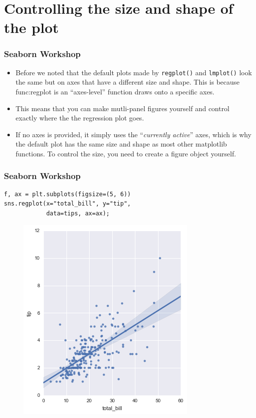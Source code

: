 \documentclass{beamer}
\begin{document}
\section{Controlling the size and shape of the plot}
\begin{frame}[fragile]
		\frametitle{Seaborn Workshop}
		\large
	\begin{itemize}
\item Before we noted that the default plots made by \texttt{regplot()} and \texttt{lmplot()} look the same but on axes that have a different size and shape. This is because func:regplot is an “axes-level” function draws onto a specific axes.
\item  This means that you can make mutli-panel figures yourself and control exactly where the the regression plot goes. 
\item If no axes is provided, it simply uses the “\textit{currently active}” axes, which is why the default plot has the same size and shape as most other matplotlib functions. To control the size, you need to create a figure object yourself.
	\end{itemize}

\end{frame}
\begin{frame}[fragile]
		\frametitle{Seaborn Workshop}
		\large
\begin{framed}
\begin{verbatim}
f, ax = plt.subplots(figsize=(5, 6))
sns.regplot(x="total_bill", y="tip", 
            data=tips, ax=ax);
\end{verbatim}
\end{framed}
\begin{figure}
	\centering
	\includegraphics[width=0.55\linewidth]{images/regression_46_0}
\end{figure}
\end{frame}
\end{document}
